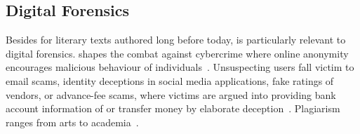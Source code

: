 \subsection{Digital Forensics}

Besides \ai{} for literary texts authored long before today, \ai{} is particularly relevant to digital forensics.
\ai{} shapes the combat against cybercrime where online anonymity encourages malicious behaviour of individuals~\citep{abbasi_writeprints_2008}.
Unsuspecting users fall victim to email scams, identity deceptions in social media applications, fake ratings of vendors, or advance-fee scams, where victims are argued into providing bank account information of or transfer money by elaborate deception~\citep{abbasi_writeprints_2008,neal_surveying_2018}.
Plagiarism ranges from arts to academia~\citep{neal_surveying_2018}.